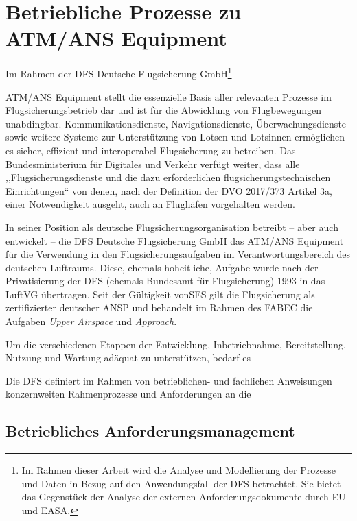 \chapter{Betriebliche Prozesse zu ATM/ANS Equipment}

\begin{center}
    \footnotesize
    Im Rahmen der DFS Deutsche Flugsicherung GmbH\footnote{Im Rahmen dieser Arbeit wird die Analyse und Modellierung der Prozesse und Daten in Bezug auf den Anwendungsfall der DFS betrachtet. Sie bietet das Gegenstück der Analyse der externen Anforderungsdokumente durch EU und EASA.}
\end{center}

\noindent
ATM/ANS Equipment stellt die essenzielle Basis aller relevanten Prozesse im Flugsicherungsbetrieb dar und ist für die Abwicklung von Flugbewegungen unabdingbar. 
Kommunikationsdienste, Navigationsdienste, Überwachungsdienste sowie weitere Systeme zur Unterstützung von Lotsen und Lotsinnen ermöglichen es sicher, effizient und interoperabel Flugsicherung zu betreiben.
Das Bundesministerium für Digitales und Verkehr verfügt weiter, dass alle ,,Flugsicherungsdienste und die dazu erforderlichen flugsicherungstechnischen Einrichtungen`` von denen, nach der Definition der \ac{DVO} 2017/373 Artikel 3a, einer Notwendigkeit ausgeht, auch an Flughäfen vorgehalten werden.
\cite[§27 d]{luftvg}

In seiner Position als deutsche Flugsicherungsorganisation betreibt -- aber auch entwickelt -- die DFS Deutsche Flugsicherung GmbH das ATM/ANS Equipment für die Verwendung in den Flugsicherungsaufgaben im Verantwortungsbereich des deutschen Luftraums. 
\cite[§27 c]{luftvg}
Diese, ehemals hoheitliche, Aufgabe wurde nach der Privatisierung der \ac{DFS} (ehemals Bundesamt für Flugsicherung) 1993 in das \ac{LuftVG} übertragen.
Seit der Gültigkeit von\ac{SES} gilt die Flugsicherung als zertifizierter deutscher \ac{ANSP} und behandelt im Rahmen des \ac{FABEC} die Aufgaben \textit{Upper Airspace} und \textit{Approach}. 


Um die verschiedenen Etappen der Entwicklung, Inbetriebnahme, Bereitstellung, Nutzung und Wartung adäquat zu unterstützen, bedarf es 


Die \ac{DFS} definiert im Rahmen von betrieblichen- und fachlichen Anweisungen konzernweiten Rahmenprozesse und Anforderungen an die   


    \section{Betriebliches Anforderungsmanagement}

